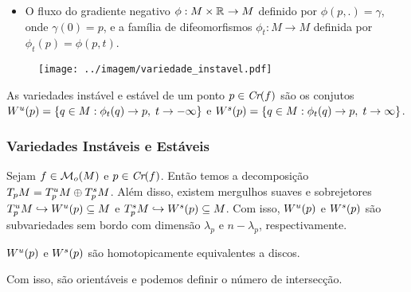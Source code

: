 \documentclass{beamer}
\begin{document}
\begin{footnotesize}
\begin{frame}
\begin{minipage}[t]{0.67\linewidth}
\begin{itemize}
			\item O fluxo do gradiente negativo $\phi:M\times \mathbb{R}^{}
			\to M$ definido por $\phi(p,.) =\gamma$, onde $\gamma(0) = p$, e a família de difeomorfismos $\phi_{t}:M\to M$ definida por $\phi_{t}(p) = \phi(p,t)$.
		\end{itemize}	
		\end{minipage}
		\hfill%
		\begin{minipage}[t]{0.30\linewidth}
			\begin{figure}[!h]
				\centering
				\texttt{[image: ../imagem/variedade\_instavel.pdf]}
			\end{figure}
		\end{minipage}
		\begin{definicao}
			As variedades instável e estável de um ponto $p \in \textit{Cr}(f)$ são os conjutos $W^{u}(p) = \{q\in M: \phi_{t}(q) \to p,\; t\to -\infty\}$ e $W^{s}(p) = \{q\in M: \phi_{t}(q) \to p,\; t\to \infty\}$.
		\end{definicao}
		
	\end{frame}
	
	\begin{frame}
		\frametitle{Variedades Instáveis e Estáveis}
		\begin{teorema}
			Sejam $f \in \mathcal{M}_{o}(M)$ e $p \in \textit{Cr}(f)$. Então temos a decomposição $T_{p}M=T^{u}_{p}M\oplus T^{s}_{p}M$. Além disso, existem mergulhos suaves e sobrejetores $T^{u}_{p}M \hookrightarrow W^{u}(p) \subseteq M$ e $T^{s}_{p}M \hookrightarrow W^{s}(p) \subseteq M$. Com isso, $W^{u}(p)$ e $W^{s}(p)$ são subvariedades sem bordo com dimensão $\lambda_{p}$ e $n-\lambda_{p}$, respectivamente.
		\end{teorema}
	
		\begin{observacao}
			$W^{u}(p)$ e $W^{s}(p)$ são homotopicamente equivalentes a discos.
		\end{observacao}
		
		\begin{tiny}
			Com isso, são orientáveis e podemos definir o número de intersecção.
		\end{tiny}
	\end{frame}
	

\end{footnotesize}
\end{document}
